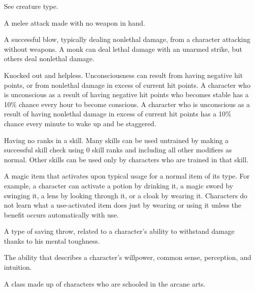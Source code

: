  See creature type. 

 A melee attack made with no weapon in hand. 

 A successful blow, typically dealing nonlethal 
damage, from a character attacking without weapons. A monk can 
deal lethal damage with an unarmed strike, but others deal 
nonlethal damage. 

 Knocked out and helpless. Unconsciousness can 
result from having negative hit points, or from 
nonlethal damage in excess of current hit points. A character who is 
unconscious as a result of having negative hit points who becomes stable has a 10\% chance every hour to become 
conscious. A character who is unconscious as a result of having 
nonlethal damage in excess of current hit points has a 10\% chance 
every minute to wake up and be staggered. 

 Having no ranks in a skill. Many skills can be used 
untrained by making a successful skill check using 0 skill ranks and 
including all other modifiers as normal. Other skills can be used 
only by characters who are trained in that skill. 

 A magic item that activates upon typical 
usage for a normal item of its type. For example, a character can 
activate a potion by drinking it, a magic sword by swinging it, a lens 
by looking through it, or a cloak by wearing it. Characters do not 
learn what a use-activated item does just by wearing or using it 
unless the benefit occurs automatically with use. 

 A type of saving throw, related to a character's ability 
to withstand damage thanks to his mental toughness. 

 The ability that describes a character's willpower, 
common sense, perception, and intuition. 

 A class made up of characters who are schooled in 
the arcane arts. 